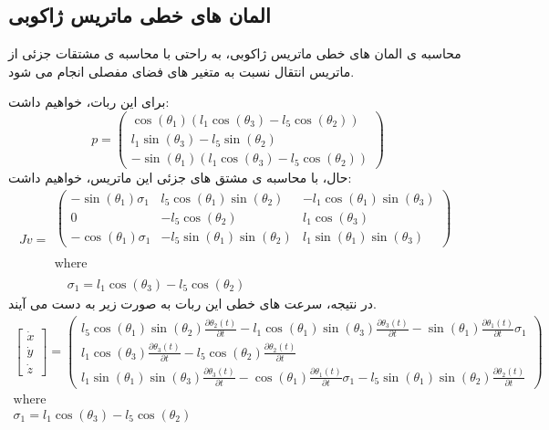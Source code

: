\subsection*{المان های خطی ماتریس ژاکوبی}
محاسبه ی المان های خطی ماتریس ژاکوبی، به راحتی با محاسبه ی مشتقات جزئی از ماتریس انتقال نسبت به متغیر های فضای مفصلی انجام می شود. 

برای این ربات، خواهیم داشت:
\[
p = 
\begin{pmatrix}
	\cos\left(\theta_1\right)\left(l_1\cos\left(\theta_3\right) - l_5\cos\left(\theta_2\right)\right) \\
	l_1\sin\left(\theta_3\right) - l_5\sin\left(\theta_2\right) \\
	-\sin\left(\theta_1\right)\left(l_1\cos\left(\theta_3\right) - l_5\cos\left(\theta_2\right)\right)
\end{pmatrix}
\]
حال، با محاسبه ی مشتق های جزئی این ماتریس، خواهیم داشت:
\[
Jv =
\begin{array}{l}
	\begin{pmatrix}
		-\sin\left(\theta_1\right)\sigma_1 & l_5\cos\left(\theta_1\right)\sin\left(\theta_2\right) & -l_1\cos\left(\theta_1\right)\sin\left(\theta_3\right) \\
		0 & -l_5\cos\left(\theta_2\right) & l_1\cos\left(\theta_3\right) \\
		-\cos\left(\theta_1\right)\sigma_1 & -l_5\sin\left(\theta_1\right)\sin\left(\theta_2\right) & l_1\sin\left(\theta_1\right)\sin\left(\theta_3\right)
	\end{pmatrix} \\
	\\
	\text{where} \\
	\\
	\quad \sigma_1 = l_1\cos\left(\theta_3\right) - l_5\cos\left(\theta_2\right)
\end{array}
\]
در نتیجه، سرعت های خطی این ربات به صورت زیر به دست می آیند.
\[
\begin{aligned}
	\begin{bmatrix}
		\dot{x} \\
		\dot{y} \\
		\dot{z}
	\end{bmatrix} =
	\begin{pmatrix}
		l_5 \cos\left(\theta_1\right) \sin\left(\theta_2\right) \frac{\partial \theta_2(t)}{\partial t}
		- l_1 \cos\left(\theta_1\right) \sin\left(\theta_3\right) \frac{\partial \theta_3(t)}{\partial t} 
		- \sin\left(\theta_1\right) \frac{\partial \theta_1(t)}{\partial t} \sigma_1 \\
		l_1 \cos\left(\theta_3\right) \frac{\partial \theta_3(t)}{\partial t} 
		- l_5 \cos\left(\theta_2\right) \frac{\partial \theta_2(t)}{\partial t} \\
		l_1 \sin\left(\theta_1\right) \sin\left(\theta_3\right) \frac{\partial \theta_3(t)}{\partial t} 
		- \cos\left(\theta_1\right) \frac{\partial \theta_1(t)}{\partial t} \sigma_1 
		- l_5 \sin\left(\theta_1\right) \sin\left(\theta_2\right) \frac{\partial \theta_2(t)}{\partial t}
	\end{pmatrix} \\
	\text{where} \\
	\sigma_1 = l_1 \cos\left(\theta_3\right) - l_5 \cos\left(\theta_2\right)
\end{aligned}
\]

